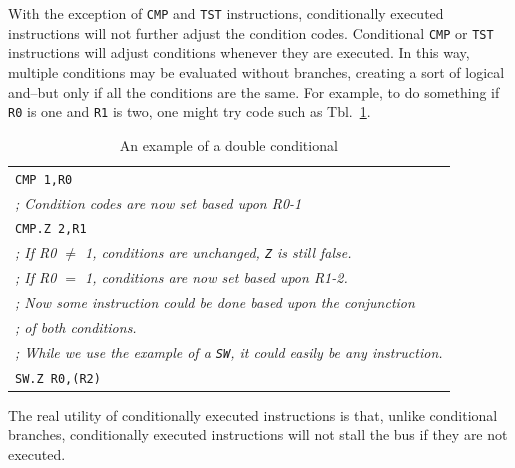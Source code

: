\documentclass{gqtekspec}
\begin{document}
With the exception of \hbox{\tt CMP} and \hbox{\tt TST} instructions,
conditionally executed instructions will not further adjust the condition
codes.  Conditional \hbox{\tt CMP} or \hbox{\tt TST} instructions will adjust
conditions whenever they are executed.  In this way, multiple conditions may
be evaluated without branches, creating a sort of logical and--but only if all
the conditions are the same.  For example, to do something if \hbox{\tt R0} is
one and \hbox{\tt R1} is two, one might try code such as
Tbl.~\ref{tbl:dbl-condition}.
\begin{table}\begin{center}
\begin{tabular}{l}
	{\tt CMP 1,R0} \\
	{\em ; Condition codes are now set based upon R0-1} \\
	{\tt CMP.Z 2,R1} \\
	{\em ; If R0 $\neq$ 1, conditions are unchanged, {\tt Z} is still false.} \\
	{\em ; If R0 $=$ 1, conditions are now set based upon R1-2.} \\
	{\em ; Now some instruction could be done based upon the conjunction} \\
	{\em ; of both conditions.} \\
	{\em ; While we use the example of a {\tt SW}, it could easily be any
		instruction.} \\
	{\tt SW.Z R0,(R2)} \\
\end{tabular}
\caption{An example of a double conditional}\label{tbl:dbl-condition}
\end{center}\end{table}

The real utility of conditionally executed instructions is that, unlike
conditional branches, conditionally executed instructions will not stall
the bus if they are not executed.
\end{document}
